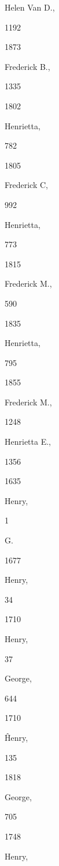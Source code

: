 {Helen Van D., 


1192 


1873 


Frederick B., 


1335 


1802 


Henrietta, 


782 


1805 


Frederick C, 


992 




Henrietta, 


773 


1815 


Frederick M., 


590 


1835 


Henrietta, 


795 


1855 


Frederick M., 


1248 




Henrietta E., 


1356 








1635 


Henry, 


1 




G. 




1677 


Henry, 


34 








1710 


Henry, 


37 




George, 


644 


1710 


\^ Henry, 


135 


1818 


George, 


705 


1748 


Henry, 


}
